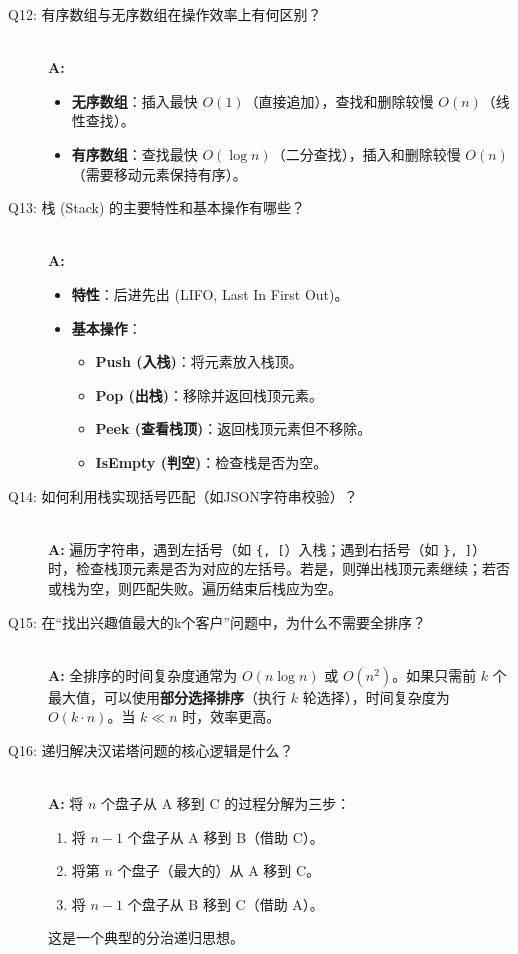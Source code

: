 \documentclass[a4paper,12pt]{article}
\begin{document}
\begin{description}
    \item[Q12: 有序数组与无序数组在操作效率上有何区别？] \hfill \\
    \textbf{A:}
    \begin{itemize}
        \item \textbf{无序数组}：插入最快 $O(1)$（直接追加），查找和删除较慢 $O(n)$（线性查找）。
        \item \textbf{有序数组}：查找最快 $O(\log n)$（二分查找），插入和删除较慢 $O(n)$（需要移动元素保持有序）。
    \end{itemize}

    \item[Q13: 栈 (Stack) 的主要特性和基本操作有哪些？] \hfill \\
    \textbf{A:}
    \begin{itemize}
        \item \textbf{特性}：后进先出 (LIFO, Last In First Out)。
        \item \textbf{基本操作}：
        \begin{itemize}
            \item \textbf{Push (入栈)}：将元素放入栈顶。
            \item \textbf{Pop (出栈)}：移除并返回栈顶元素。
            \item \textbf{Peek (查看栈顶)}：返回栈顶元素但不移除。
            \item \textbf{IsEmpty (判空)}：检查栈是否为空。
        \end{itemize}
    \end{itemize}

    \item[Q14: 如何利用栈实现括号匹配（如JSON字符串校验）？] \hfill \\
    \textbf{A:} 遍历字符串，遇到左括号（如 \texttt{\{, [}）入栈；遇到右括号（如 \texttt{\}, ]}）时，检查栈顶元素是否为对应的左括号。若是，则弹出栈顶元素继续；若否或栈为空，则匹配失败。遍历结束后栈应为空。

    \item[Q15: 在“找出兴趣值最大的k个客户”问题中，为什么不需要全排序？] \hfill \\
    \textbf{A:} 全排序的时间复杂度通常为 $O(n \log n)$ 或 $O(n^2)$。如果只需前 $k$ 个最大值，可以使用\textbf{部分选择排序}（执行 $k$ 轮选择），时间复杂度为 $O(k \cdot n)$。当 $k \ll n$ 时，效率更高。

    \item[Q16: 递归解决汉诺塔问题的核心逻辑是什么？] \hfill \\
    \textbf{A:} 将 $n$ 个盘子从 A 移到 C 的过程分解为三步：
    \begin{enumerate}
        \item 将 $n-1$ 个盘子从 A 移到 B（借助 C）。
        \item 将第 $n$ 个盘子（最大的）从 A 移到 C。
        \item 将 $n-1$ 个盘子从 B 移到 C（借助 A）。
    \end{enumerate}
    这是一个典型的分治递归思想。


\end{description}
\end{document}
